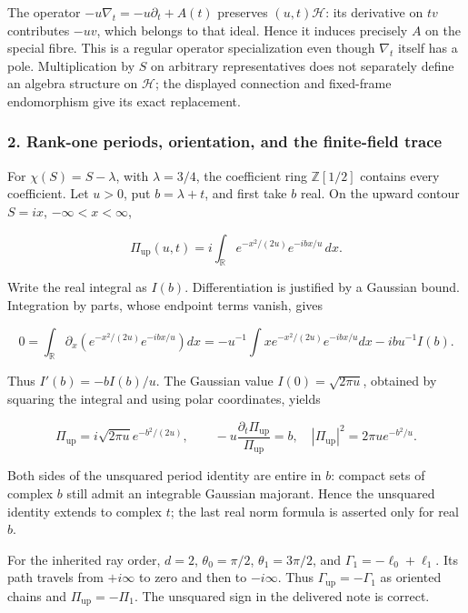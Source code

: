 The operator \(-u\nabla_t=-u\partial_t+A(t)\) preserves \((u,t)\mathcal H\): its derivative on \(tv\) contributes \(-uv\), which belongs to that ideal. Hence it induces precisely \(A\) on the special fibre. This is a regular operator specialization even though \(\nabla_t\) itself has a pole. Multiplication by \(S\) on arbitrary representatives does not separately define an algebra structure on \(\mathcal H\); the displayed connection and fixed-frame endomorphism give its exact replacement.

\subsubsection{2. Rank-one periods, orientation, and the finite-field trace}\label{endpoint-purity_review--rank-one-periods-orientation-and-the-finite-field-trace}

For \(\chi(S)=S-\lambda\), with \(\lambda=3/4\), the coefficient ring \(\mathbb Z[1/2]\) contains every coefficient. Let \(u>0\), put \(b=\lambda+t\), and first take \(b\) real. On the upward contour \(S=ix\), \(-\infty<x<\infty\),

\[
\Pi_{\mathrm{up}}(u,t)
=i\int_{\mathbb R}e^{-x^2/(2u)}e^{-ibx/u}\,dx.
\tag{DP.5}
\]

Write the real integral as \(I(b)\). Differentiation is justified by a Gaussian bound. Integration by parts, whose endpoint terms vanish, gives

\[
0=\int_{\mathbb R}\partial_x
       (e^{-x^2/(2u)}e^{-ibx/u})dx
=-u^{-1}\int x e^{-x^2/(2u)}e^{-ibx/u}dx
 -ibu^{-1}I(b).
\]

Thus \(I'(b)=-bI(b)/u\). The Gaussian value \(I(0)=\sqrt{2\pi u}\), obtained by squaring the integral and using polar coordinates, yields

\[
\Pi_{\mathrm{up}}=i\sqrt{2\pi u}
 e^{-b^2/(2u)},\qquad
-u\frac{\partial_t\Pi_{\mathrm{up}}}{\Pi_{\mathrm{up}}}=b,
\quad |\Pi_{\mathrm{up}}|^2=2\pi u e^{-b^2/u}.
\tag{DP.6}
\]

Both sides of the unsquared period identity are entire in \(b\): compact sets of complex \(b\) still admit an integrable Gaussian majorant. Hence the unsquared identity extends to complex \(t\); the last real norm formula is asserted only for real \(b\).

For the inherited ray order, \(d=2\), \(\theta_0=\pi/2\), \(\theta_1=3\pi/2\), and \(\Gamma_1=-\ell_0+\ell_1\). Its path travels from \(+i\infty\) to zero and then to \(-i\infty\). Thus \(\Gamma_{\mathrm{up}}=-\Gamma_1\) as oriented chains and \(\Pi_{\mathrm{up}}=-\Pi_1\). The unsquared sign in the delivered note is correct.

